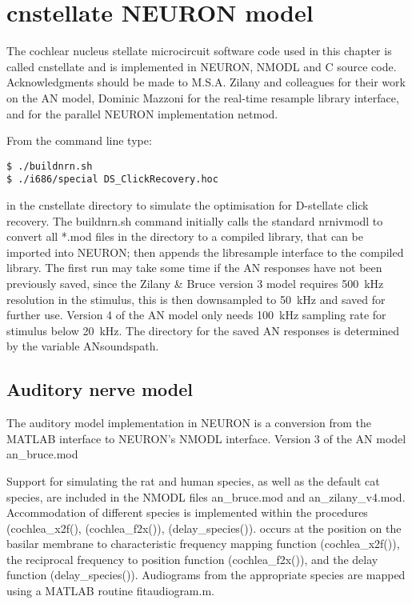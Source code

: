 \graphicspath{{../figures/}{./gfx/}{/media/data/Work/cnstellate/}{/media/data/Work/cnstellate/Responses/}}

\chapter{cnstellate NEURON model}

The cochlear nucleus stellate microcircuit software code used in this chapter is
called \textsf{cnstellate} and is implemented in NEURON, NMODL and C source
code. Acknowledgments should be made to M.S.A. Zilany and colleagues for their
work on the AN model, Dominic Mazzoni for the real-time resample library
interface, and \citet{MiglioreCanniaEtAl:2006} for the parallel NEURON
implementation \textsf{netmod}.

From the command line type:
\begin{verbatim}
$ ./buildnrn.sh
$ ./i686/special DS_ClickRecovery.hoc
\end{verbatim}
in the \textsf{cnstellate} directory to simulate the optimisation for D-stellate
click recovery.  The \textsf{buildnrn.sh} command initially calls the standard
\textsf{nrnivmodl} to convert all *.mod files in the directory to a compiled
library, that can be imported into NEURON; then appends the libresample
interface to the compiled library. The first run may take some time if the AN
responses have not been previously saved, since the Zilany \& Bruce version 3
model requires 500~kHz resolution in the stimulus, this is then downsampled to
50~kHz and saved for further use. Version 4 of the AN model
\citep{ZilanyBruceEtAl:2009} only needs 100~kHz sampling rate for stimulus below
20~kHz. The directory for the saved AN responses is determined by the variable
\textsf{ANsoundspath}.

\section{Auditory nerve model}

The auditory model implementation in NEURON is a conversion from the
MATLAB interface to NEURON's NMODL interface. Version 3 of the AN model \mbox{\textsf{an\_bruce.mod}}

Support for simulating the rat and human species, as well as the default cat species,  are included in the NMODL files
\mbox{\textsf{an\_bruce.mod}} and \mbox{\textsf{an\_zilany\_v4.mod}}.
Accommodation of different species is implemented within the procedures
(\mbox{\textsf{cochlea\_x2f()}}, (\mbox{\textsf{cochlea\_f2x()}}),
(\mbox{\textsf{delay\_species()}}). occurs at the position on the basilar
membrane to characteristic frequency mapping function
(\mbox{\textsf{cochlea\_x2f()}}), the reciprocal frequency to position function
(\mbox{\textsf{cochlea\_f2x()}}), and the delay function
(\mbox{\textsf{delay\_species()}}).  Audiograms from the appropriate species are
mapped using a MATLAB routine \mbox{\textsf{fitaudiogram.m}}.

